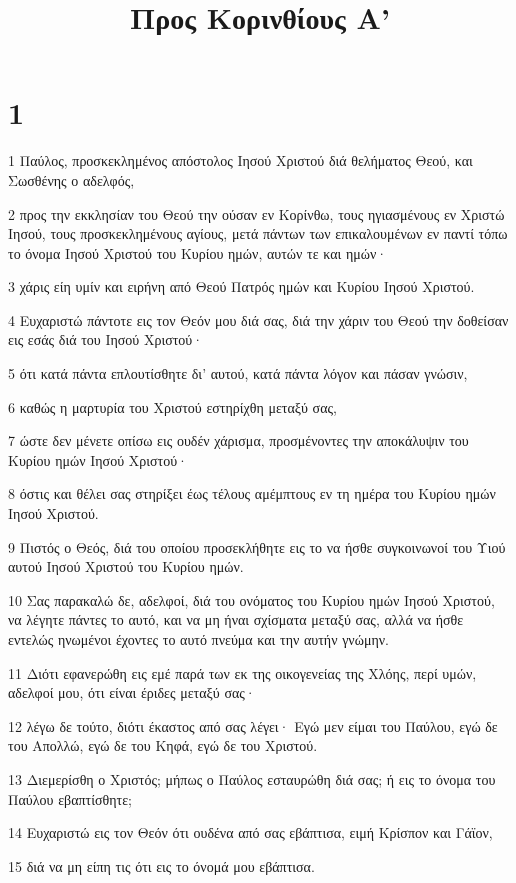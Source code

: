 

\title{Προς Κορινθίους Α'}


\chapter{1}

\par 1 Παύλος, προσκεκλημένος απόστολος Ιησού Χριστού διά θελήματος Θεού, και Σωσθένης ο αδελφός,
\par 2 προς την εκκλησίαν του Θεού την ούσαν εν Κορίνθω, τους ηγιασμένους εν Χριστώ Ιησού, τους προσκεκλημένους αγίους, μετά πάντων των επικαλουμένων εν παντί τόπω το όνομα Ιησού Χριστού του Κυρίου ημών, αυτών τε και ημών·
\par 3 χάρις είη υμίν και ειρήνη από Θεού Πατρός ημών και Κυρίου Ιησού Χριστού.
\par 4 Ευχαριστώ πάντοτε εις τον Θεόν μου διά σας, διά την χάριν του Θεού την δοθείσαν εις εσάς διά του Ιησού Χριστού·
\par 5 ότι κατά πάντα επλουτίσθητε δι' αυτού, κατά πάντα λόγον και πάσαν γνώσιν,
\par 6 καθώς η μαρτυρία του Χριστού εστηρίχθη μεταξύ σας,
\par 7 ώστε δεν μένετε οπίσω εις ουδέν χάρισμα, προσμένοντες την αποκάλυψιν του Κυρίου ημών Ιησού Χριστού·
\par 8 όστις και θέλει σας στηρίξει έως τέλους αμέμπτους εν τη ημέρα του Κυρίου ημών Ιησού Χριστού.
\par 9 Πιστός ο Θεός, διά του οποίου προσεκλήθητε εις το να ήσθε συγκοινωνοί του Υιού αυτού Ιησού Χριστού του Κυρίου ημών.
\par 10 Σας παρακαλώ δε, αδελφοί, διά του ονόματος του Κυρίου ημών Ιησού Χριστού, να λέγητε πάντες το αυτό, και να μη ήναι σχίσματα μεταξύ σας, αλλά να ήσθε εντελώς ηνωμένοι έχοντες το αυτό πνεύμα και την αυτήν γνώμην.
\par 11 Διότι εφανερώθη εις εμέ παρά των εκ της οικογενείας της Χλόης, περί υμών, αδελφοί μου, ότι είναι έριδες μεταξύ σας·
\par 12 λέγω δε τούτο, διότι έκαστος από σας λέγει· Εγώ μεν είμαι του Παύλου, εγώ δε του Απολλώ, εγώ δε του Κηφά, εγώ δε του Χριστού.
\par 13 Διεμερίσθη ο Χριστός; μήπως ο Παύλος εσταυρώθη διά σας; ή εις το όνομα του Παύλου εβαπτίσθητε;
\par 14 Ευχαριστώ εις τον Θεόν ότι ουδένα από σας εβάπτισα, ειμή Κρίσπον και Γάϊον,
\par 15 διά να μη είπη τις ότι εις το όνομά μου εβάπτισα.
